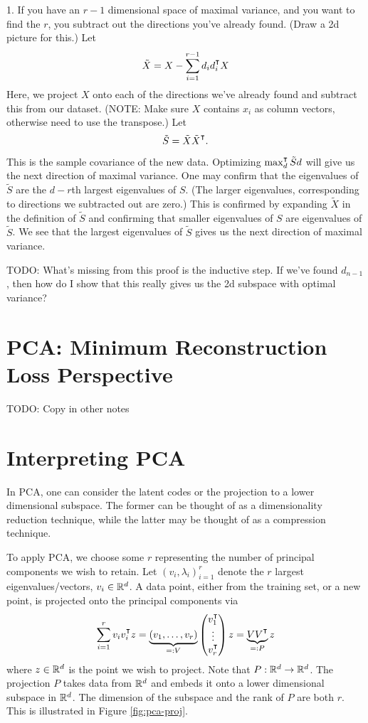 1. If you have an $r-1$ dimensional space of maximal variance, and you want to find the $r$, you subtract out the directions you've already found. (Draw a 2d picture for this.) Let
$$
\tilde X = X - \sum_{i=1}^{r-1} d_i d_i^\T X
$$
Here, we project $X$ onto each of the directions we've already found and subtract this from our dataset. (NOTE: Make sure $X$ contains $x_i$ as column vectors, otherwise need to use the transpose.) 
Let 
$$
\tilde S = \tilde X\tilde X^\T. 
$$
This is the sample covariance of the new data. Optimizing $\max_d^\T \tilde S d$ will give us the next direction of maximal variance. One may confirm that the eigenvalues of $\tilde S$ are the $d-r$th largest eigenvalues of $S$. (The larger eigenvalues, corresponding to directions we subtracted out are zero.) This is confirmed by expanding $\tilde X$ in the definition of $\tilde S$ and confirming that smaller eigenvalues of $S$ are eigenvalues of $\tilde S$. We see that the largest eigenvalues of $\tilde S$ gives us the next direction of maximal variance. 

TODO: What's missing from this proof is the inductive step. If we've found $d_{n-1}$, then how do I show that this really gives us the 2d subspace with optimal variance? 

\section{PCA: Minimum Reconstruction Loss Perspective}
TODO: Copy in other notes

\section{Interpreting PCA}
 In PCA, one can consider the latent codes or the projection to a lower dimensional subspace. The former can be thought of as a dimensionality reduction technique, while the latter may be thought of as a compression technique. 

To apply PCA, we choose some $r$ representing the number of principal components we wish to retain. Let $(v_i, \lambda_i)_{i=1}^r$ denote the $r$ largest eigenvalues/vectors, $v_i\in \mathbb{R}^d$. 
A data point, either from the training set, or a new point, is projected onto the principal components via
\begin{equation} \label{eq:PCA-proj}
\sum_{i=1}^r v_i v_i^\T z = \underbrace{(v_1,\ldots, v_r)}_{=: V} 
\begin{pmatrix}
v_1^\T\\
\vdots\\
v_r^\T
\end{pmatrix} z = \underbrace{V V^\T}_{=: P} z
\end{equation}
where $z\in \mathbb{R}^d$ is the point we wish to project. Note that $P: \mathbb{R}^d\to\mathbb{R}^d$. The projection $P$ takes data from $\mathbb{R}^d$ and embeds it onto a lower dimensional subspace in $\mathbb{R}^d$. The dimension of the subspace and the rank of $P$ are both $r$. This is illustrated in Figure \ref{fig:pca-proj}. 

